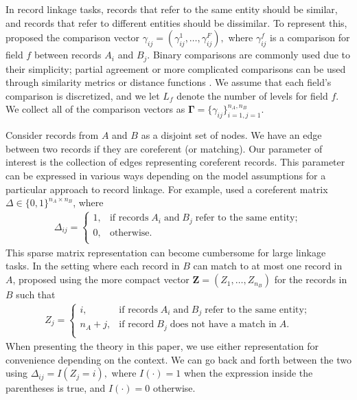 \documentclass[12pt,letterpaper]{article}
\newcommand{\1}[1]{\mathbb{I}\!\left[#1\right]} %
\begin{document}
In record linkage tasks, records that refer to the same entity should be similar, and records that refer to different entities should be dissimilar. To represent this, \cite{fellegi_theory_1969} proposed the comparison vector $\gamma_{ij} = (\gamma_{ij}^1, \ldots, \gamma_{ij}^F),$ where $\gamma_{ij}^f$ is a comparison for field $f$ between records $A_i$ and $B_j$. Binary comparisons are commonly used due to their simplicity; partial agreement or more complicated comparisons can be used through similarity metrics or distance functions \citep{Winkler_1990, Bilenko_2003_adapt, elmagarmid_duplicate_2007}. We assume that each field's comparison is discretized, and we let $L_f$ denote the number of levels for field $f$. We collect all of the comparison vectors as $\bm{\Gamma}=\{\gamma_{ij}\}_{i=1,j=1}^{n_A,n_B}$.

Consider records from $A$ and $B$ as a disjoint set of nodes. We have an edge between two records if they are coreferent (or matching). Our parameter of interest is the collection of edges representing coreferent records. This parameter can be expressed in various ways depending on the model assumptions for a particular approach to record linkage. For example, \cite{fellegi_theory_1969} used a coreferent matrix $\Delta \in \{0, 1\}^{n_A \times n_B}$, where
\begin{align}\label{eqn:delta-notation}
	\Delta_{ij} =
	\begin{cases}
		1, & \text{if records}\;  A_i \; \text{and}\; B_j \; \text{refer to the same entity}; \\
		0, & \text{otherwise}.\\
	\end{cases}
\end{align}
This sparse matrix representation can become cumbersome for large linkage tasks. In the setting where each record in $B$ can match to at most one record in $A$, \cite{sadinle_bayesian_2017} proposed using the more compact vector $\bm{Z} = (Z_1, \ldots, Z_{n_B})$ for the records in $B$ such that
\begin{align*}%
	Z_{j} =
	\begin{cases}
		i, & \text{if records}\;  A_i \; \text{and}\; B_j  \; \text{refer to the same entity}; \\
		n_A + j, & \text{if record}\;  B_j \; \text{does not have a match in}\; A. \\
	\end{cases}
\end{align*}
When presenting the theory in this paper, we use either representation for convenience depending on the context. We can go back and forth between the two using $\Delta_{ij} = I(Z_j = i),$ where $I(\cdot) = 1$ when the expression inside the parentheses is true, and $I(\cdot) = 0$ otherwise.
\end{document}
